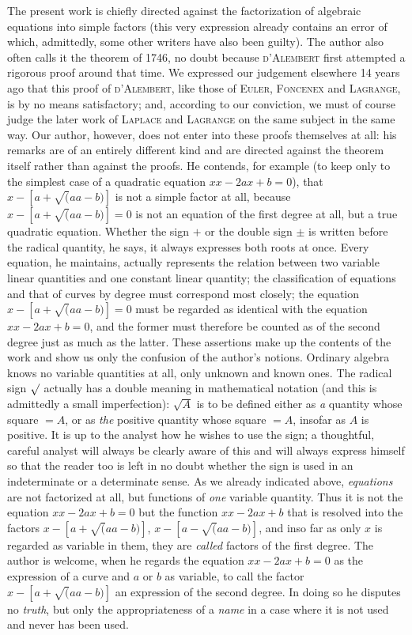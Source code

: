 The present work is chiefly directed against the factorization of algebraic equations into simple factors (this very expression already contains an error of which, admittedly, some other writers have also
been guilty). The author also often calls it the theorem of 1746, no doubt because \textsc{d’Alembert} first attempted a rigorous proof around that time. We expressed our judgement elsewhere 14 years ago that this proof of \textsc{d’Alembert}, like those of \textsc{Euler}, \textsc{Foncenex} and \textsc{Lagrange}, is by no means satisfactory; and, according to our conviction, we must of course judge the later work of \textsc{Laplace} and \textsc{Lagrange} on the same subject in the same way. Our author, however, does not enter into these proofs themselves at all: his remarks are of an entirely different kind and are directed against the theorem itself rather than against the proofs. He contends, for example (to keep only to the simplest case of a quadratic equation $xx-2ax+b=0$), that $x-[a+\surd(aa-b)]$ is not a simple factor at all, because $x-[a+\surd(aa-b)]=0$ is not an equation of the first degree at all, but a true quadratic equation. Whether the sign $+$ or the double sign $\pm$ is written before the radical quantity, he says, it always expresses both roots at once. Every equation, he maintains, actually represents the relation between two variable linear quantities and one constant linear quantity; the classification of equations and that of curves by degree must correspond most closely; the equation $x-[a+\surd(aa-b)]=0$ must be regarded as identical with the equation $xx-2ax+b=0$, and the former must therefore be counted as of the second degree just as much as the latter. These assertions make up the contents of the work and show us only the confusion of the author's notions. Ordinary algebra knows no variable quantities at all, only unknown and known ones. The radical sign $\surd$ actually has a double meaning in mathematical notation (and this is admittedly a small imperfection): $\surd A$ is to be defined either as \textit{a} quantity whose square $=A$, or as \textit{the} positive quantity whose square $=A$, insofar as $A$ is positive. It is up to the analyst how he wishes to use the sign; a thoughtful, careful analyst will always be clearly aware of this and will always express himself so that the reader too is left in no doubt whether the sign is used in an indeterminate or a determinate sense. As we already indicated above, \textit{equations} are not factorized at all, but functions of \textit{one} variable quantity. Thus it is not the equation $xx-2ax+b=0$ but the function $xx-2ax+b$ that is resolved into the factors $x-[a+\surd(aa-b)]$, $x-[a-\surd(aa-b)]$, and inso%
far as only $x$ is regarded as variable in them, they are \textit{called} factors of the first degree. The author is welcome, when he regards the equation $xx-2ax+b=0$ as the expression of a curve and $a$ or $b$ as variable, to call the factor $x-[a+\surd(aa-b)]$ an expression of the second degree. In doing so he disputes no \textit{truth}, but only the appropriateness of a \textit{name} in a case where it is not used and never has been used.\par

